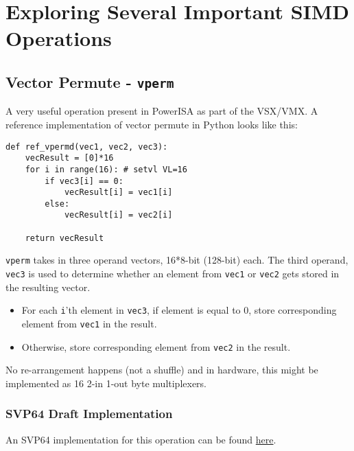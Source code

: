 %
\section{Exploring Several Important SIMD Operations}
\subsection{Vector Permute - \texttt{vperm}}

A very useful operation present in PowerISA as part of the
\acrshort{VSX}/\acrshort{VMX}.
A reference implementation of vector permute in Python looks like this:

\begin{verbatim}
def ref_vpermd(vec1, vec2, vec3):
    vecResult = [0]*16
    for i in range(16): # setvl VL=16
        if vec3[i] == 0:
            vecResult[i] = vec1[i]
        else:
            vecResult[i] = vec2[i]

    return vecResult
\end{verbatim}

\texttt{vperm} takes in three operand vectors, 16*8-bit (128-bit) each.
The third operand, \texttt{vec3} is used to determine whether an element from
\texttt{vec1} or \texttt{vec2} gets stored in the resulting vector.

\begin{itemize}
  \item For each \texttt{i}'th element in \texttt{vec3}, if element is
        equal to 0, store corresponding element from \texttt{vec1} in the result.
  \item Otherwise, store corresponding element from \texttt{vec2} in the result.
\end{itemize}

No re-arrangement happens (not a shuffle) and in hardware, this might be
implemented as 16 2-in 1-out byte multiplexers.

\subsubsection{SVP64 Draft Implementation}

An SVP64 implementation for this operation can be found
\href{https://github.com/ngisearchsvp64/glibc-svp64/blob/master/svp64-port/svp64/vperm_svp64.s}{here}.

